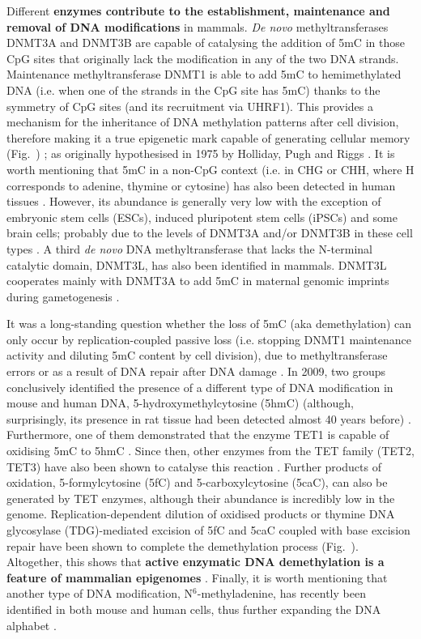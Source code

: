 \bigskip

Different \textbf{enzymes contribute to the establishment, maintenance and removal of DNA modifications} in mammals. \textit{De novo} methyltransferases DNMT3A and DNMT3B are capable of catalysing the addition of 5mC in those CpG sites that originally lack the modification in any of the two DNA strands. Maintenance methyltransferase DNMT1 is able to add 5mC to hemimethylated DNA (i.e. when one of the strands in the CpG site has 5mC) thanks to the symmetry of CpG sites (and its recruitment via UHRF1). This provides a mechanism for the inheritance of DNA methylation patterns after cell division, therefore making it a true epigenetic mark capable of generating cellular memory (Fig.~) \cite{Li2014,Smith2013}; as originally hypothesised in 1975 by Holliday, Pugh and Riggs \cite{Holliday1975,Riggs1975}. It is worth mentioning that 5mC in a non-CpG context (i.e. in \acrshort{CHG} or \acrshort{CHH}, where H corresponds to adenine, thymine or cytosine) has also been detected in human tissues \cite{Schultz2015}. However, its abundance is generally very low with the exception of embryonic stem cells (\acrshort{ESCs}), induced pluripotent stem cells (\acrshort{iPSCs}) and some brain cells; probably due to the levels of DNMT3A and/or DNMT3B in these cell types \cite{Ziller2011,He2015}. A third \textit{de novo} DNA methyltransferase that lacks the N-terminal catalytic domain, DNMT3L, has also been identified in mammals. DNMT3L cooperates mainly with DNMT3A to add 5mC in maternal genomic imprints during gametogenesis \cite{Bourchis2001,Tomida2018}.

\bigskip

It was a long-standing question whether the loss of 5mC (aka demethylation) can only occur by replication-coupled passive loss (i.e. stopping DNMT1 maintenance activity and diluting 5mC content by cell division), due to methyltransferase errors or as a result of DNA repair after DNA damage \cite{Iurlaro2017}. In 2009, two groups conclusively identified the presence of a different type of DNA modification in mouse and human DNA, 5-hydroxymethylcytosine (\acrshort{5hmC}) \cite{Kriaucionis2009,Tahiliani2009} (although, surprisingly, its presence in rat tissue had been detected almost 40 years before) \cite{Penn1972}. Furthermore, one of them demonstrated that the enzyme TET1 is capable of oxidising 5mC to 5hmC \cite{Tahiliani2009}. Since then, other enzymes from the TET family (TET2, TET3) have also been shown to catalyse this reaction \cite{Ito2010}. Further products of oxidation, 5-formylcytosine (\acrshort{5fC}) and 5-carboxylcytosine (\acrshort{5caC}), can also be generated by TET enzymes, although their abundance is incredibly low in the genome. Replication-dependent dilution of oxidised products or thymine DNA glycosylase (\acrshort{TDG})-mediated excision of 5fC and 5caC coupled with base excision repair have been shown to complete the demethylation process (Fig.~). Altogether, this shows that \textbf{active enzymatic DNA demethylation is a feature of mammalian epigenomes} \cite{Wu2017}. Finally, it is worth mentioning that another type of DNA modification, N$^6$-methyladenine, has recently been identified in both mouse and human cells, thus further expanding the DNA alphabet \cite{Wu2016,Xiao2018}.

